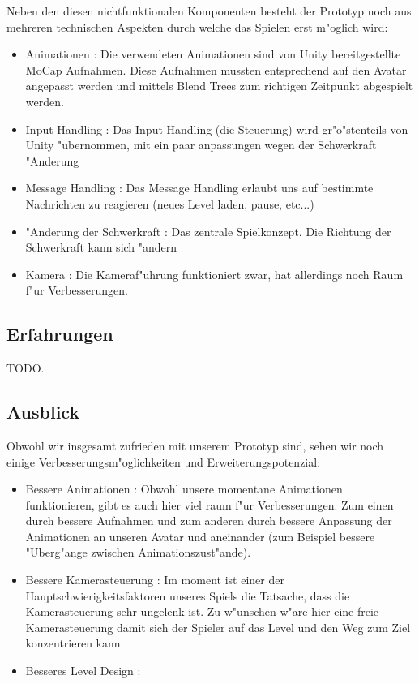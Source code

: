 Neben den diesen nichtfunktionalen Komponenten besteht der Prototyp noch aus mehreren technischen Aspekten durch welche das Spielen erst m"oglich wird:
\begin{itemize}
	\item Animationen : Die verwendeten Animationen sind von Unity bereitgestellte MoCap Aufnahmen. Diese Aufnahmen mussten entsprechend auf den Avatar angepasst werden und mittels Blend Trees zum richtigen Zeitpunkt abgespielt werden.
	\item Input Handling : Das Input Handling (die Steuerung) wird gr"o"stenteils von Unity "ubernommen, mit ein paar anpassungen wegen der Schwerkraft "Anderung
	\item Message Handling : Das Message Handling erlaubt uns auf bestimmte Nachrichten zu reagieren (neues Level laden, pause, etc...)
	\item "Anderung der Schwerkraft : Das zentrale Spielkonzept. Die Richtung der Schwerkraft kann sich "andern
	\item Kamera : Die Kameraf"uhrung funktioniert zwar, hat allerdings noch Raum f"ur Verbesserungen.
\end{itemize} 
%
\subsection{Erfahrungen}
\label{sec:results/xp}
%
TODO.
%
\subsection{Ausblick}
\label{sec:results/future}
%
Obwohl wir insgesamt zufrieden mit unserem Prototyp sind, sehen wir noch einige Verbesserungsm"oglichkeiten und Erweiterungspotenzial:
\begin{itemize}
	\item Bessere Animationen : Obwohl unsere momentane Animationen funktionieren, gibt es auch hier viel raum f"ur Verbesserungen. Zum einen durch bessere Aufnahmen und zum anderen durch bessere Anpassung der Animationen an unseren Avatar und aneinander (zum Beispiel bessere "Uberg"ange zwischen Animationszust"ande).
	\item Bessere Kamerasteuerung : Im moment ist einer der Hauptschwierigkeitsfaktoren unseres Spiels die Tatsache, dass die Kamerasteuerung sehr ungelenk ist. Zu w"unschen w"are hier eine freie Kamerasteuerung damit sich der Spieler auf das Level und den Weg zum Ziel konzentrieren kann.
	\item Besseres Level Design : 
\end{itemize}
